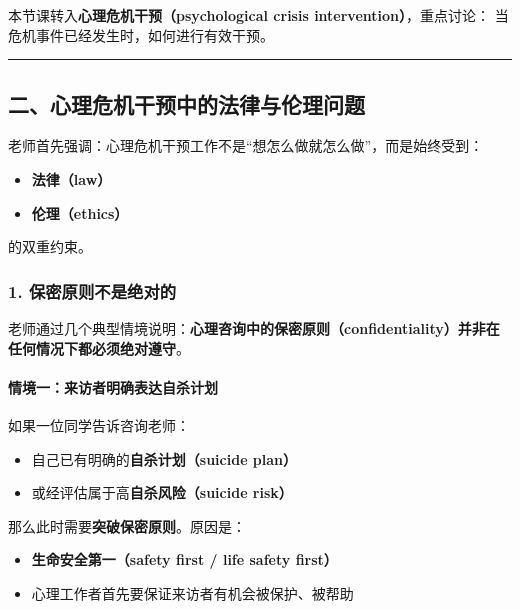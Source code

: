 \documentclass[
  chinese,
  9pt,
  a4paper,
]{ctexart}
\providecommand{\tightlist}{%
  \setlength{\itemsep}{0pt}\setlength{\parskip}{0pt}}
\begin{document}
本节课转入\textbf{心理危机干预（psychological crisis
intervention）}，重点讨论： 当危机事件已经发生时，如何进行有效干预。

\begin{center}\rule{0.5\linewidth}{0.5pt}\end{center}

\subsection{二、心理危机干预中的法律与伦理问题}\label{ux4e8cux5fc3ux7406ux5371ux673aux5e72ux9884ux4e2dux7684ux6cd5ux5f8bux4e0eux4f26ux7406ux95eeux9898}

老师首先强调：心理危机干预工作不是``想怎么做就怎么做''，而是始终受到：

\begin{itemize}
\tightlist
\item
  \textbf{法律（law）}
\item
  \textbf{伦理（ethics）}
\end{itemize}

的双重约束。

\subsubsection{1.
保密原则不是绝对的}\label{ux4fddux5bc6ux539fux5219ux4e0dux662fux7eddux5bf9ux7684}

老师通过几个典型情境说明：\textbf{心理咨询中的保密原则（confidentiality）并非在任何情况下都必须绝对遵守}。

\paragraph{情境一：来访者明确表达自杀计划}\label{ux60c5ux5883ux4e00ux6765ux8bbfux8005ux660eux786eux8868ux8fbeux81eaux6740ux8ba1ux5212}

如果一位同学告诉咨询老师：

\begin{itemize}
\tightlist
\item
  自己已有明确的\textbf{自杀计划（suicide plan）}
\item
  或经评估属于高\textbf{自杀风险（suicide risk）}
\end{itemize}

那么此时需要\textbf{突破保密原则}。原因是：

\begin{itemize}
\tightlist
\item
  \textbf{生命安全第一（safety first / life safety first）}
\item
  心理工作者首先要保证来访者有机会被保护、被帮助
\end{itemize}
\end{document}
